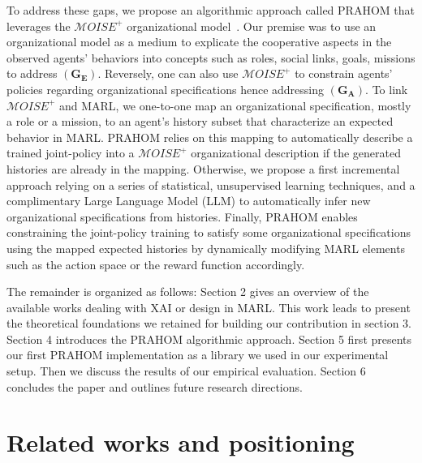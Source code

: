 \documentclass[runningheads]{llncs}
\begin{document}
To address these gaps, we propose an algorithmic approach called PRAHOM that leverages the $\mathcal{M}OISE^+$ organizational model~\cite{Hubner2007}. Our premise was to use an organizational model as a medium to explicate the cooperative aspects in the observed agents' behaviors into concepts such as roles, social links, goals, missions to address $(\mathbf{G_E})$. Reversely, one can also use $\mathcal{M}OISE^+$ to constrain agents' policies regarding organizational specifications hence addressing $(\mathbf{G_A})$. To link $\mathcal{M}OISE^+$ and MARL, we one-to-one map an organizational specification, mostly a role or a mission, to an agent's history subset that characterize an expected behavior in MARL. PRAHOM relies on this mapping to automatically describe a trained joint-policy into a $\mathcal{M}OISE^+$ organizational description if the generated histories are already in the mapping. Otherwise, we propose a first incremental approach relying on a series of statistical, unsupervised learning techniques, and a complimentary Large Language Model (LLM) to automatically infer new organizational specifications from histories. Finally, PRAHOM enables constraining the joint-policy training to satisfy some organizational specifications using the mapped expected histories by dynamically modifying MARL elements such as the action space or the reward function accordingly.

The remainder is organized as follows: Section 2 gives an overview of the available works dealing with XAI or design in MARL. This work leads to present the theoretical foundations we retained for building our contribution in section 3. Section 4 introduces the PRAHOM algorithmic approach. Section 5 first presents our first PRAHOM implementation as a library we used in our experimental setup. Then we discuss the results of our empirical evaluation. Section 6 concludes the paper and outlines future research directions.



\section{Related works and positioning}


\end{document}
